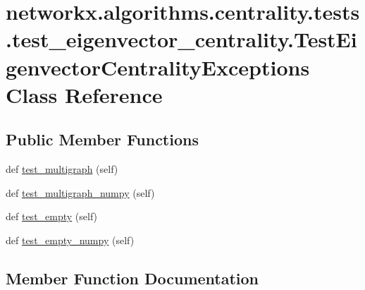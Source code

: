 \hypertarget{classnetworkx_1_1algorithms_1_1centrality_1_1tests_1_1test__eigenvector__centrality_1_1TestEigenvectorCentralityExceptions}{}\section{networkx.\+algorithms.\+centrality.\+tests.\+test\+\_\+eigenvector\+\_\+centrality.\+Test\+Eigenvector\+Centrality\+Exceptions Class Reference}
\label{classnetworkx_1_1algorithms_1_1centrality_1_1tests_1_1test__eigenvector__centrality_1_1TestEigenvectorCentralityExceptions}
\subsection*{Public Member Functions}
\begin{DoxyCompactItemize}
\item 
def \hyperlink{classnetworkx_1_1algorithms_1_1centrality_1_1tests_1_1test__eigenvector__centrality_1_1TestEigenvectorCentralityExceptions_a388b59e30344497cac8df51f8e3ce37a}{test\+\_\+multigraph} (self)
\item 
def \hyperlink{classnetworkx_1_1algorithms_1_1centrality_1_1tests_1_1test__eigenvector__centrality_1_1TestEigenvectorCentralityExceptions_a93280526baac17bdb691b44b8c048759}{test\+\_\+multigraph\+\_\+numpy} (self)
\item 
def \hyperlink{classnetworkx_1_1algorithms_1_1centrality_1_1tests_1_1test__eigenvector__centrality_1_1TestEigenvectorCentralityExceptions_a02ed891e4a935fe582e9c4941ccd3be9}{test\+\_\+empty} (self)
\item 
def \hyperlink{classnetworkx_1_1algorithms_1_1centrality_1_1tests_1_1test__eigenvector__centrality_1_1TestEigenvectorCentralityExceptions_a950f550a195b5913ef741fe6b23e4ede}{test\+\_\+empty\+\_\+numpy} (self)
\end{DoxyCompactItemize}


\subsection{Member Function Documentation}
\mbox{\label{classnetworkx_1_1algorithms_1_1centrality_1_1tests_1_1test__eigenvector__centrality_1_1TestEigenvectorCentralityExceptions_a02ed891e4a935fe582e9c4941ccd3be9}} 
